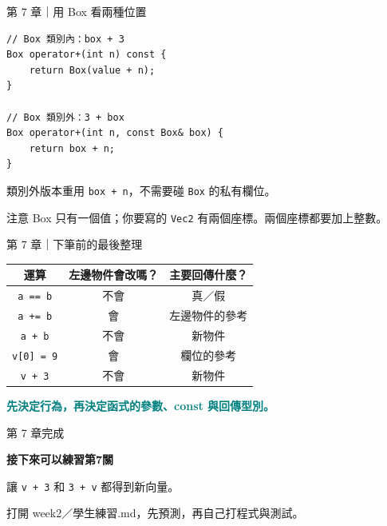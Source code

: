 \documentclass[aspectratio=169,11pt]{beamer}
\newcommand{\key}[1]{\textcolor{teal}{\textbf{#1}}}
\newcommand{\practice}[2]{%
  \begin{frame}[plain]
    \vspace*{1.5cm}
    {\large\color{muted} 第 #1 章完成}\par\vspace{0.45cm}
    {\Huge\bfseries\color{teal} 接下來可以練習第#1關}\par\vspace{0.7cm}
    {\Large #2}\par\vfill
    {\small\color{muted} 打開 week2／學生練習.md，先預測，再自己打程式與測試。}
  \end{frame}
}
\begin{document}
\begin{frame}[fragile]{第 7 章｜用 Box 看兩種位置}
\begin{lstlisting}
// Box 類別內：box + 3
Box operator+(int n) const {
    return Box(value + n);
}

// Box 類別外：3 + box
Box operator+(int n, const Box& box) {
    return box + n;
}
\end{lstlisting}
  類別外版本重用 \texttt{box + n}，不需要碰 \texttt{Box} 的私有欄位。
  \begin{block}{注意}
    Box 只有一個值；你要寫的 \texttt{Vec2} 有兩個座標。兩個座標都要加上整數。
  \end{block}
\end{frame}

\begin{frame}{第 7 章｜下筆前的最後整理}
  \begin{center}
  \begin{tabular}{c|c|c}
    運算 & 左邊物件會改嗎？ & 主要回傳什麼？ \\ \hline
    \texttt{a == b} & 不會 & 真／假 \\
    \texttt{a += b} & 會 & 左邊物件的參考 \\
    \texttt{a + b} & 不會 & 新物件 \\
    \texttt{v[0] = 9} & 會 & 欄位的參考 \\
    \texttt{v + 3} & 不會 & 新物件
  \end{tabular}
  \end{center}
  \vspace{0.5em}
  \key{先決定行為，再決定函式的參數、const 與回傳型別。}
\end{frame}
\practice{7}{讓 \texttt{v + 3} 和 \texttt{3 + v} 都得到新向量。}
\end{document}
